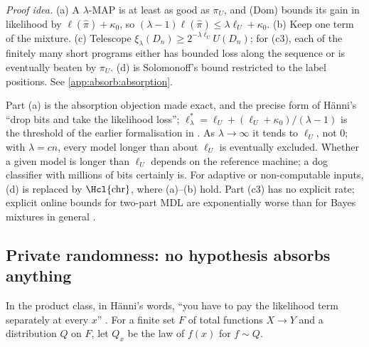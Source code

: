 \emph{Proof idea.} (a) A $\lambda$-MAP is at least as good as $\pi_U$, and (Dom) bounds its gain in likelihood by $\ell(\hat\pi)+\kappa_0$, so $(\lambda-1)\ell(\hat\pi)\le\lambda\ell_U+\kappa_0$. (b) Keep one term of the mixture. (c) Telescope $\xi_\lambda(D_n)\ge2^{-\lambda\ell_U}U(D_n)$; for (c3), each of the finitely many short programs either has bounded loss along the sequence or is eventually beaten by $\pi_U$. (d) is Solomonoff's bound \citep{solomonoff1978complexity} restricted to the label positions. See \cref{app:absorb:absorption}.

\begin{remark}[Reading]\label{rem:absorb:reading}
Part (a) is the absorption objection made exact, and the precise form of H\"anni's ``drop bits and take the likelihood loss''; $\ell^*_\lambda=\ell_U+(\ell_U+\kappa_0)/(\lambda-1)$ is the threshold of the earlier formalisation in \citet[section ``Simplicity and normativity from imitation'']{claude2026whatfollows}. As $\lambda\to\infty$ it tends to $\ell_U$, not $0$; with $\lambda=cn$, every model longer than about $\ell_U$ is eventually excluded. Whether a given model is longer than $\ell_U$ depends on the reference machine; a dog classifier with millions of bits certainly is. For adaptive or non-computable inputs, (d) is replaced by $\Hcl{\mathrm{chr}}$, where (a)--(b) hold. Part (c3) has no explicit rate; explicit online bounds for two-part MDL are exponentially worse than for Bayes mixtures in general \citep{poland2005asymptotics}.
\end{remark}

\subsection{Private randomness: no hypothesis absorbs anything}\label{sec:absorb:private}

In the product class, in H\"anni's words, ``you have to pay the likelihood term separately at every $x$'' \citep{hanni2026notes}. For a finite set $F$ of total functions $X\to Y$ and a distribution $Q$ on $F$, let $Q_x$ be the law of $f(x)$ for $f\sim Q$.

